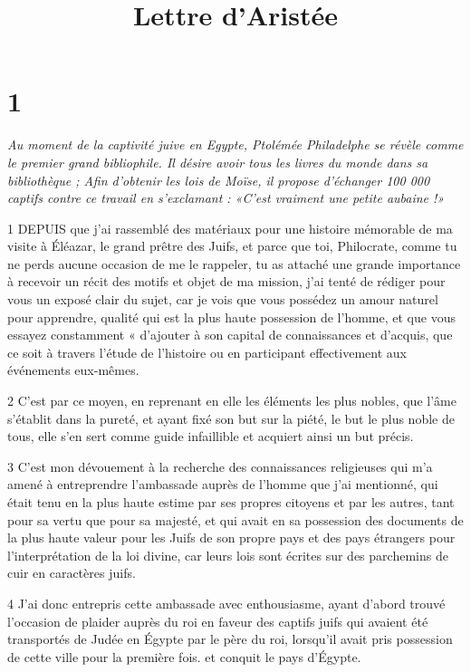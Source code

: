 

\title{Lettre d'Aristée}

\chapter{1}

\par \textit{Au moment de la captivité juive en Egypte, Ptolémée Philadelphe se révèle comme le premier grand bibliophile. Il désire avoir tous les livres du monde dans sa bibliothèque ; Afin d'obtenir les lois de Moïse, il propose d'échanger 100 000 captifs contre ce travail en s'exclamant : «C'est vraiment une petite aubaine !»}

\par 1 DEPUIS que j'ai rassemblé des matériaux pour une histoire mémorable de ma visite à Éléazar, le grand prêtre des Juifs, et parce que toi, Philocrate, comme tu ne perds aucune occasion de me le rappeler, tu as attaché une grande importance à recevoir un récit des motifs et objet de ma mission, j'ai tenté de rédiger pour vous un exposé clair du sujet, car je vois que vous possédez un amour naturel pour apprendre, qualité qui est la plus haute possession de l'homme, et que vous essayez constamment « d'ajouter à son capital de connaissances et d'acquis, que ce soit à travers l'étude de l'histoire ou en participant effectivement aux événements eux-mêmes.

\par 2 C'est par ce moyen, en reprenant en elle les éléments les plus nobles, que l'âme s'établit dans la pureté, et ayant fixé son but sur la piété, le but le plus noble de tous, elle s'en sert comme guide infaillible et acquiert ainsi un but précis.

\par 3 C'est mon dévouement à la recherche des connaissances religieuses qui m'a amené à entreprendre l'ambassade auprès de l'homme que j'ai mentionné, qui était tenu en la plus haute estime par ses propres citoyens et par les autres, tant pour sa vertu que pour sa majesté, et qui avait en sa possession des documents de la plus haute valeur pour les Juifs de son propre pays et des pays étrangers pour l'interprétation de la loi divine, car leurs lois sont écrites sur des parchemins de cuir en caractères juifs.

\par 4 J'ai donc entrepris cette ambassade avec enthousiasme, ayant d'abord trouvé l'occasion de plaider auprès du roi en faveur des captifs juifs qui avaient été transportés de Judée en Égypte par le père du roi, lorsqu'il avait pris possession de cette ville pour la première fois. et conquit le pays d'Égypte.

